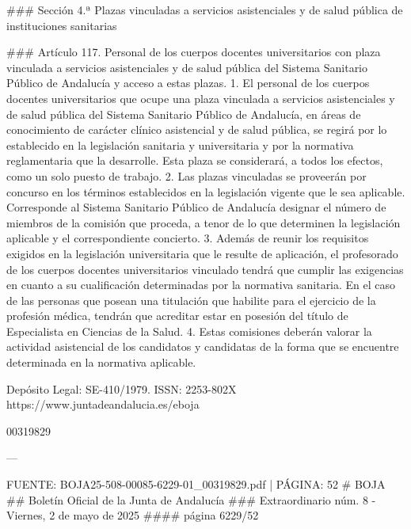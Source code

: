 \documentclass{article}
\begin{document}
\begin{itemize}
\begin{itemize}
\begin{scriptsize}
                  \#\#\# Sección 4.ª Plazas vinculadas a servicios asistenciales y de salud pública de instituciones sanitarias

                  \#\#\# Artículo 117. Personal de los cuerpos docentes universitarios con plaza vinculada a servicios asistenciales y de salud pública del Sistema Sanitario Público de Andalucía y acceso a estas plazas.
                  1. El personal de los cuerpos docentes universitarios que ocupe una plaza vinculada a servicios asistenciales y de salud pública del Sistema Sanitario Público de Andalucía, en áreas de conocimiento de carácter clínico asistencial y de salud pública, se regirá por lo establecido en la legislación sanitaria y universitaria y por la normativa reglamentaria que la desarrolle. Esta plaza se considerará, a todos los efectos, como un solo puesto de trabajo.
                  2. Las plazas vinculadas se proveerán por concurso en los términos establecidos en la legislación vigente que le sea aplicable. Corresponde al Sistema Sanitario Público de Andalucía designar el número de miembros de la comisión que proceda, a tenor de lo que determinen la legislación aplicable y el correspondiente concierto.
                  3. Además de reunir los requisitos exigidos en la legislación universitaria que le resulte de aplicación, el profesorado de los cuerpos docentes universitarios vinculado tendrá que cumplir las exigencias en cuanto a su cualificación determinadas por la normativa sanitaria. En el caso de las personas que posean una titulación que habilite para el ejercicio de la profesión médica, tendrán que acreditar estar en posesión del título de Especialista en Ciencias de la Salud.
                  4. Estas comisiones deberán valorar la actividad asistencial de los candidatos y candidatas de la forma que se encuentre determinada en la normativa aplicable.

                  Depósito Legal: SE-410/1979. ISSN: 2253-802X https://www.juntadeandalucia.es/eboja

                  00319829

                  ---

                  FUENTE: BOJA25-508-00085-6229-01\_00319829.pdf | PÁGINA: 52
                  \# BOJA
                  \#\# Boletín Oficial de la Junta de Andalucía
                  \#\#\# Extraordinario núm. 8 - Viernes, 2 de mayo de 2025
                  \#\#\#\# página 6229/52


\end{scriptsize}
\end{itemize}
\end{itemize}
\end{document}
